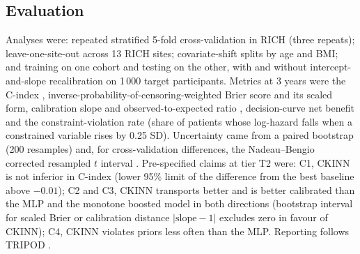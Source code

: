 \documentclass[11pt]{article}
\begin{document}
\subsection{Evaluation}
\label{sec:claims}
Analyses were: repeated stratified 5-fold cross-validation in RICH (three repeats); leave-one-site-out across 13 RICH sites; covariate-shift splits by age and BMI; and training on one cohort and testing on the other, with and without intercept-and-slope recalibration on 1\,000 target participants. Metrics at 3 years were the C-index \citep{harrell1996,uno2011}, inverse-probability-of-censoring-weighted Brier score \citep{graf1999} and its scaled form, calibration slope and observed-to-expected ratio \citep{steyerberg2010,vancalster2019}, decision-curve net benefit \citep{vickers2006} and the constraint-violation rate (share of patients whose log-hazard falls when a constrained variable rises by 0.25 SD). Uncertainty came from a paired bootstrap (200 resamples) and, for cross-validation differences, the Nadeau--Bengio corrected resampled $t$ interval \citep{nadeau2003}. Pre-specified claims at tier T2 were: C1, CKINN is not inferior in C-index (lower 95\% limit of the difference from the best baseline above $-0.01$); C2 and C3, CKINN transports better and is better calibrated than the MLP and the monotone boosted model in both directions (bootstrap interval for scaled Brier or calibration distance $|\text{slope}-1|$ excludes zero in favour of CKINN); C4, CKINN violates priors less often than the MLP. Reporting follows TRIPOD \citep{collins2015}.





\end{document}
